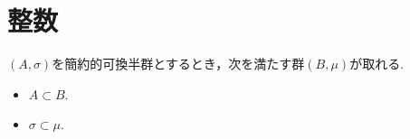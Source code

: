 \section{整数}
	\begin{screen}
		\begin{thm}[半群の群への拡張]\label{thm:extension_of_semigroup}
			$(A,\sigma)$を簡約的可換半群とするとき，次を満たす群$(B,\mu)$が取れる.
			\begin{itemize}
				\item $A \subset B$.
				\item $\sigma \subset \mu$.
			\end{itemize}
		\end{thm}
	\end{screen}